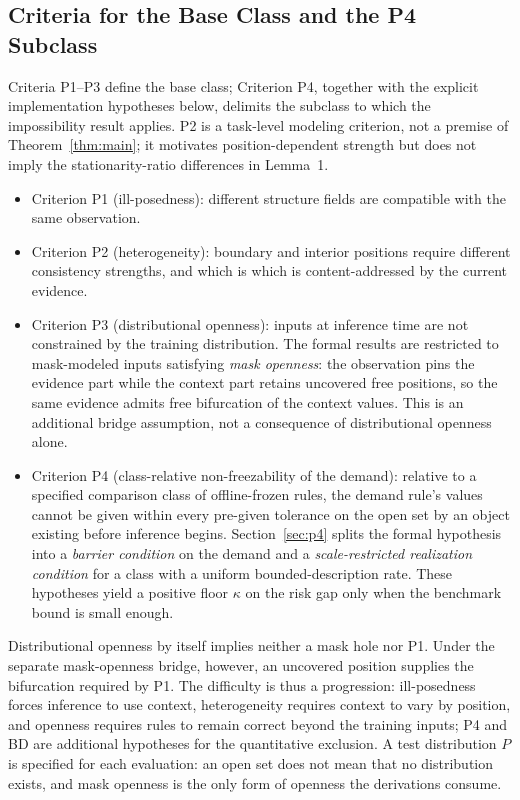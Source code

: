 \documentclass[twoside,11pt]{article}
\begin{document}
\subsection{Criteria for the Base Class and the P4 Subclass}

Criteria P1--P3 define the base class; Criterion P4, together with the explicit implementation hypotheses below, delimits the subclass to which the impossibility result applies. P2 is a task-level modeling criterion, not a premise of Theorem~\ref{thm:main}; it motivates position-dependent strength but does not imply the stationarity-ratio differences in Lemma~1.

\begin{itemize}
\item Criterion P1 (ill-posedness): different structure fields are compatible with the same observation.
\item Criterion P2 (heterogeneity): boundary and interior positions require different consistency strengths, and which is which is content-addressed by the current evidence.
\item Criterion P3 (distributional openness): inputs at inference time are not constrained by the training distribution. The formal results are restricted to mask-modeled inputs satisfying \emph{mask openness}: the observation pins the evidence part while the context part retains uncovered free positions, so the same evidence admits free bifurcation of the context values. This is an additional bridge assumption, not a consequence of distributional openness alone.
\item Criterion P4 (class-relative non-freezability of the demand): relative to a specified comparison class of offline-frozen rules, the demand rule's values cannot be given within every pre-given tolerance on the open set by an object existing before inference begins. Section~\ref{sec:p4} splits the formal hypothesis into a \emph{barrier condition} on the demand and a \emph{scale-restricted realization condition} for a class with a uniform bounded-description rate. These hypotheses yield a positive floor $\kappa$ on the risk gap only when the benchmark bound is small enough.
\end{itemize}

Distributional openness by itself implies neither a mask hole nor P1. Under the separate mask-openness bridge, however, an uncovered position supplies the bifurcation required by P1. The difficulty is thus a progression: ill-posedness forces inference to use context, heterogeneity requires context to vary by position, and openness requires rules to remain correct beyond the training inputs; P4 and BD are additional hypotheses for the quantitative exclusion. A test distribution $P$ is specified for each evaluation: an open set does not mean that no distribution exists, and mask openness is the only form of openness the derivations consume.
\end{document}
